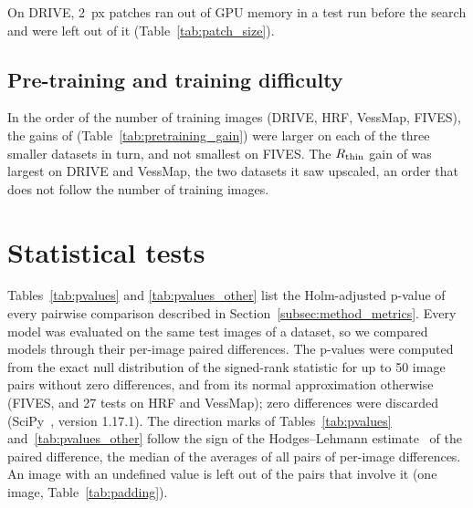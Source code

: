 On DRIVE, 2~px patches ran out of GPU memory in a test run before the search and were left out of it (Table~\ref{tab:patch_size}).

\subsection{Pre-training and training difficulty}


In the order of the number of training images (DRIVE, HRF, VessMap, FIVES), the gains of \litemedsam{} (Table~\ref{tab:pretraining_gain}) were larger on each of the three smaller datasets in turn, and not smallest on FIVES. The $R_{\mathrm{thin}}$ gain of \medsam{} was largest on DRIVE and VessMap, the two datasets it saw upscaled, an order that does not follow the number of training images.

\section{Statistical tests}
\label{app:statistics}


Tables~\ref{tab:pvalues} and \ref{tab:pvalues_other} list the Holm-adjusted p-value of every pairwise comparison described in Section~\ref{subsec:method_metrics}.
Every model was evaluated on the same test images of a dataset, so we compared models through their per-image paired differences. The p-values were computed from the exact null distribution of the signed-rank statistic for up to 50 image pairs without zero differences, and from its normal approximation otherwise (FIVES, and 27 tests on HRF and VessMap); zero differences were discarded (SciPy~\cite{virtanen2020scipy}, version 1.17.1). The direction marks of Tables~\ref{tab:pvalues} and~\ref{tab:pvalues_other} follow the sign of the Hodges--Lehmann estimate~\cite{hodges1963estimates} of the paired difference, the median of the averages of all pairs of per-image differences. An image with an undefined value is left out of the pairs that involve it (one image, Table~\ref{tab:padding}).

\clearpage
